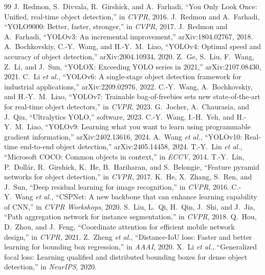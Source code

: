 \documentclass[11pt,a4paper]{article}
\begin{document}
\begin{thebibliography}{99}
 J.~Redmon, S.~Divvala, R.~Girshick, and A.~Farhadi, ``You Only Look Once: Unified, real-time object detection,'' in \emph{CVPR}, 2016.
 J.~Redmon and A.~Farhadi, ``YOLO9000: Better, faster, stronger,'' in \emph{CVPR}, 2017.
 J.~Redmon and A.~Farhadi, ``YOLOv3: An incremental improvement,'' arXiv:1804.02767, 2018.
 A.~Bochkovskiy, C.-Y.~Wang, and H.-Y.~M.~Liao, ``YOLOv4: Optimal speed and accuracy of object detection,'' arXiv:2004.10934, 2020.
 Z.~Ge, S.~Liu, F.~Wang, Z.~Li, and J.~Sun, ``YOLOX: Exceeding YOLO series in 2021,'' arXiv:2107.08430, 2021.
 C.~Li \emph{et al.}, ``YOLOv6: A single-stage object detection framework for industrial applications,'' arXiv:2209.02976, 2022.
 C.-Y.~Wang, A.~Bochkovskiy, and H.-Y.~M.~Liao, ``YOLOv7: Trainable bag-of-freebies sets new state-of-the-art for real-time object detectors,'' in \emph{CVPR}, 2023.
 G.~Jocher, A.~Chaurasia, and J.~Qiu, ``Ultralytics YOLO,'' software, 2023.
 C.-Y.~Wang, I.-H.~Yeh, and H.-Y.~M.~Liao, ``YOLOv9: Learning what you want to learn using programmable gradient information,'' arXiv:2402.13616, 2024.
 A.~Wang \emph{et al.}, ``YOLOv10: Real-time end-to-end object detection,'' arXiv:2405.14458, 2024.
 T.-Y.~Lin \emph{et al.}, ``Microsoft COCO: Common objects in context,'' in \emph{ECCV}, 2014.
 T.-Y.~Lin, P.~Dollár, R.~Girshick, K.~He, B.~Hariharan, and S.~Belongie, ``Feature pyramid networks for object detection,'' in \emph{CVPR}, 2017.
 K.~He, X.~Zhang, S.~Ren, and J.~Sun, ``Deep residual learning for image recognition,'' in \emph{CVPR}, 2016.
 C.-Y.~Wang \emph{et al.}, ``CSPNet: A new backbone that can enhance learning capability of CNN,'' in \emph{CVPR Workshops}, 2020.
 S.~Liu, L.~Qi, H.~Qin, J.~Shi, and J.~Jia, ``Path aggregation network for instance segmentation,'' in \emph{CVPR}, 2018.
 Q.~Hou, D.~Zhou, and J.~Feng, ``Coordinate attention for efficient mobile network design,'' in \emph{CVPR}, 2021.
 Z.~Zheng \emph{et al.}, ``Distance-IoU loss: Faster and better learning for bounding box regression,'' in \emph{AAAI}, 2020.
 X.~Li \emph{et al.}, ``Generalized focal loss: Learning qualified and distributed bounding boxes for dense object detection,'' in \emph{NeurIPS}, 2020.

\end{thebibliography}
\end{document}

